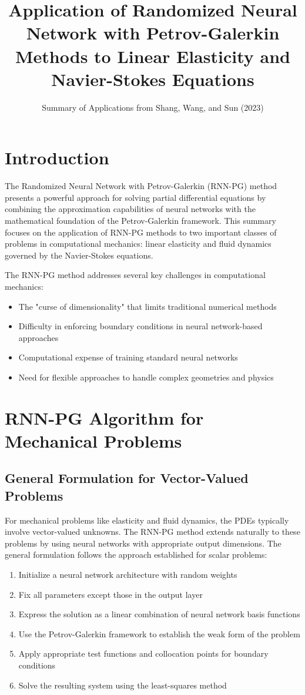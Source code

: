 \documentclass[11pt,a4paper]{article}
\title{Application of Randomized Neural Network with Petrov-Galerkin Methods to Linear Elasticity and Navier-Stokes Equations}
\author{Summary of Applications from Shang, Wang, and Sun (2023)}
\date{}
\begin{document}
\maketitle

\section{Introduction}

The Randomized Neural Network with Petrov-Galerkin (RNN-PG) method presents a powerful approach for solving partial differential equations by combining the approximation capabilities of neural networks with the mathematical foundation of the Petrov-Galerkin framework. This summary focuses on the application of RNN-PG methods to two important classes of problems in computational mechanics: linear elasticity and fluid dynamics governed by the Navier-Stokes equations.

The RNN-PG method addresses several key challenges in computational mechanics:
\begin{itemize}
    \item The "curse of dimensionality" that limits traditional numerical methods
    \item Difficulty in enforcing boundary conditions in neural network-based approaches
    \item Computational expense of training standard neural networks
    \item Need for flexible approaches to handle complex geometries and physics
\end{itemize}

\section{RNN-PG Algorithm for Mechanical Problems}

\subsection{General Formulation for Vector-Valued Problems}

For mechanical problems like elasticity and fluid dynamics, the PDEs typically involve vector-valued unknowns. The RNN-PG method extends naturally to these problems by using neural networks with appropriate output dimensions. The general formulation follows the approach established for scalar problems:

\begin{enumerate}
    \item Initialize a neural network architecture with random weights
    \item Fix all parameters except those in the output layer
    \item Express the solution as a linear combination of neural network basis functions
    \item Use the Petrov-Galerkin framework to establish the weak form of the problem
    \item Apply appropriate test functions and collocation points for boundary conditions
    \item Solve the resulting system using the least-squares method
\end{enumerate}
\end{document}
